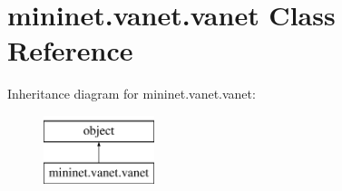 \hypertarget{classmininet_1_1vanet_1_1vanet}{\section{mininet.\-vanet.\-vanet Class Reference}
\label{classmininet_1_1vanet_1_1vanet}
}
Inheritance diagram for mininet.\-vanet.\-vanet\-:\begin{figure}[H]
\begin{center}
\leavevmode
\includegraphics[height=2.000000cm]{classmininet_1_1vanet_1_1vanet}
\end{center}
\end{figure}
